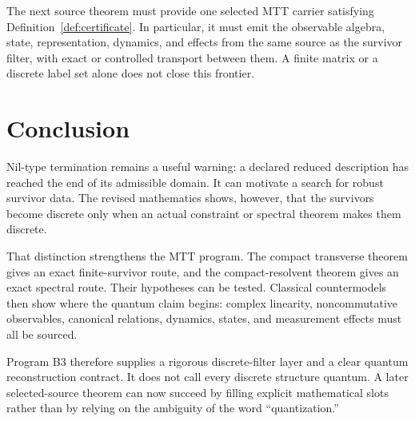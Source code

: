 \documentclass[11pt]{article}
\begin{document}
The next source theorem must provide one selected MTT carrier satisfying
Definition~\ref{def:certificate}.  In particular, it must emit the observable
algebra, state, representation, dynamics, and effects from the same source as
the survivor filter, with exact or controlled transport between them.  A
finite matrix or a discrete label set alone does not close this frontier.

\section{Conclusion}

Nil-type termination remains a useful warning: a declared reduced description
has reached the end of its admissible domain.  It can motivate a search for
robust survivor data.  The revised mathematics shows, however, that the
survivors become discrete only when an actual constraint or spectral theorem
makes them discrete.

That distinction strengthens the MTT program.  The compact transverse theorem
gives an exact finite-survivor route, and the compact-resolvent theorem gives an
exact spectral route.  Their hypotheses can be tested.  Classical
countermodels then show where the quantum claim begins: complex linearity,
noncommutative observables, canonical relations, dynamics, states, and
measurement effects must all be sourced.

Program B3 therefore supplies a rigorous discrete-filter layer and a clear
quantum reconstruction contract.  It does not call every discrete structure
quantum.  A later selected-source theorem can now succeed by filling explicit
mathematical slots rather than by relying on the ambiguity of the word
``quantization.''
\end{document}
